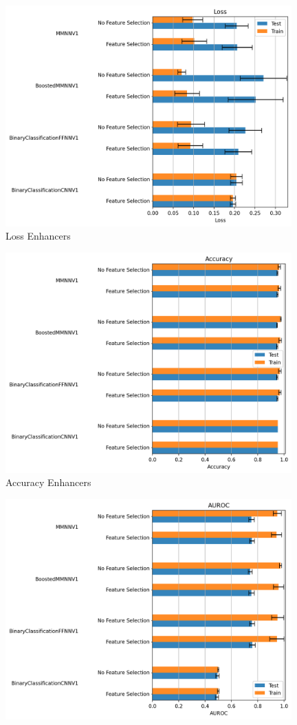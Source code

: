 \documentclass{article}
\begin{document}
\begin{enumerate}
    \begin{figure}[!ht]
    \centering
    \includegraphics[width=11cm]{image/barplots/enhancers/Loss_enhancers.PNG}
    \caption{Loss Enhancers}
    \label{fig:Loss_enhancers}
    \end{figure}
    \begin{figure}[!ht]
        \centering
        \includegraphics[width=11cm]{image/barplots/enhancers/Accuracy_enhancers.PNG}
        \caption{Accuracy Enhancers}
        \label{fig:Accuracy_enhancers}
    \end{figure}
    \begin{figure}[!ht]
        \centering
        \includegraphics[width=11cm]{image/barplots/enhancers/AUROC_enhancers.PNG}

\end{figure}
\end{enumerate}
\end{document}

